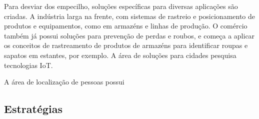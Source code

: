Para desviar dos empecilho, soluções específicas para diversas aplicações são criadas. A indústria larga na frente, com sistemas de rastreio e posicionamento de produtos e equipamentos, como em armazéns e linhas de produção. O comércio também já possui soluções para prevenção de perdas e roubos, e começa a aplicar os conceitos de rastreamento de produtos de armazéns para identificar roupas e sapatos em estantes, por exemplo. A área de soluções para cidades pesquisa tecnologias IoT.

A área de localização de pessoas possui 

\subsection{Estratégias}

